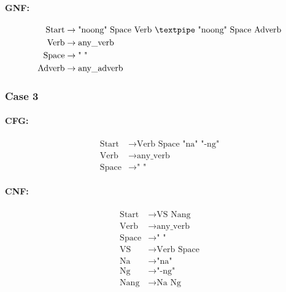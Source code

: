\paragraph{GNF:}

\begin{equation*}
    \begin{aligned}
        \text{Start} &\rightarrow \text{"noong" Space Verb {\textpipe} "noong" Space Adverb} \\
        \text{Verb} &\rightarrow \text{any\_verb} \\
        \text{Space} &\rightarrow \text{" "} \\
        \text{Adverb} &\rightarrow \text{any\_adverb}
    \end{aligned}
\end{equation*}


\subsubsection{Case 3}

\paragraph{CFG:}

\begin{equation*}
    \begin{aligned}
        \text{Start} &\rightarrow \text{Verb Space "na" "-ng"} \\
        \text{Verb} &\rightarrow \text{any\_verb} \\
        \text{Space} &\rightarrow \text{" "}
    \end{aligned}
\end{equation*}

\paragraph{CNF:}

\begin{equation*}
    \begin{aligned}
        \text{Start} &\rightarrow \text{VS Nang} \\
        \text{Verb} &\rightarrow \text{any\_verb} \\
        \text{Space} &\rightarrow \text{" "} \\
        \text{VS} &\rightarrow \text{Verb Space} \\
        \text{Na} &\rightarrow \text{"na"} \\
        \text{Ng} &\rightarrow \text{"-ng"} \\
        \text{Nang} &\rightarrow \text{Na Ng}
    \end{aligned}
\end{equation*}

